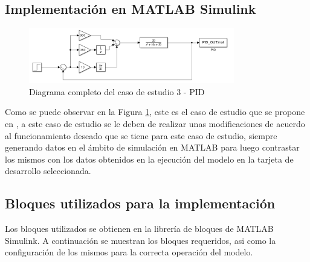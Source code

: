 \subsection{Implementación en MATLAB Simulink}

\begin{figure}[h!]
    \centering
    \includegraphics[width=0.8\textwidth]{fig/Capitulo5/Caso_de_estudio_PID/PID_Diagram.pdf}
    \caption{Diagrama completo del caso de estudio 3 - PID }
    \label{fig:caso_de_estudio_3_PID}
\end{figure}


Como se puede observar en la Figura \ref{fig:caso_de_estudio_3_PID}, este es el caso de estudio que se propone en \cite{microcontrollerslab_pid_controller_design}, a este caso de estudio se le deben de realizar unas modificaciones de acuerdo al funcionamiento deseado que se tiene para este caso de estudio, siempre generando datos en el ámbito de simulación en MATLAB para luego contrastar los mismos con los datos obtenidos en la ejecución del modelo en la tarjeta de desarrollo seleccionada.

\subsection{Bloques utilizados para la implementación}

Los bloques utilizados se obtienen en la librería de bloques de MATLAB Simulink. A continuación se muestran los bloques requeridos, asi como la configuración de los mismos para la correcta operación del modelo.

